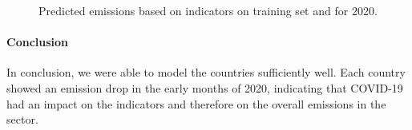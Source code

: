 \begin{figure}[h]
	\caption{Predicted emissions based on indicators on training set and for 2020.}
	\label{fig:mobility_pred}
\end{figure}	


\paragraph{Conclusion}

In conclusion, we were able to model the countries sufficiently well. Each country showed an emission drop in the early months of 2020, indicating that COVID-19 had an impact on the indicators and therefore on the overall emissions in the sector.
